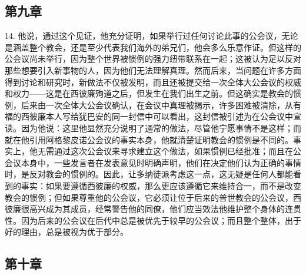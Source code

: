 
\subsection{第九章}

14. 他说，通过这个见证，他充分证明，如果举行过任何讨论此事的公会议，无论是涵盖整个教会，还是至少代表我们海外的弟兄们，他会多么乐意作证。但这样的公会议尚未举行，因为整个世界被惯例的强力纽带联系在一起；这被认为足以反对那些想要引入新事物的人，因为他们无法理解真理。然而后来，当问题在许多方面得到讨论和研究时，新做法不仅被发明，而且还被提交给一次全体大公会议的权威和权力——这是在西彼廉殉道之后，但发生在我们出生之前。但这确实是教会的惯例，后来由一次全体大公会议确认，在会议中真理被揭示，许多困难被清除，从有福的西彼廉本人写给犹巴安的同一封信中可以看出，这封信被引述为在公会议中宣读。因为他说：这里他显然充分说明了通常的做法，尽管他宁愿事情不是这样；而就在他引用阿格黎皮诺公会议的事实本身，他就清楚证明教会的惯例是不同的。事实上，他无需通过这次公会议来寻求建立这个做法，如果惯例已经批准；而且在公会议本身中，一些发言者在发表意见时明确声明，他们在决定他们认为正确的事情时，是反对教会的惯例的。因此，让多纳徒派考虑这一点，这无疑是任何人都能看到的事实：如果要遵循西彼廉的权威，那么更应该遵循它来维持合一，而不是改变教会的惯例；但如果尊重他的公会议，它必须让位于后来的普世教会的公会议，西彼廉很高兴成为其成员，经常警告他的同僚，他们应当效法他维护整个身体的连贯性。因为后来的公会议在后代中总是被优先于较早的公会议；而且整个整体，出于好的理由，总是被视为优于部分。\par


\subsection{第十章}

